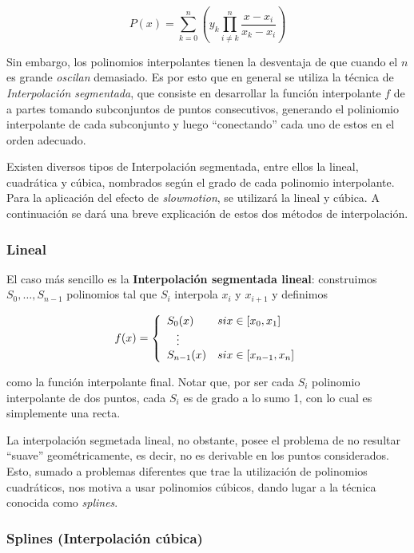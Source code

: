 \[P(x) = \sum_{k = 0}^n \left(y_k \prod_{i \neq k}^n \frac{x - x_i}{x_k - x_i}\right)\]

Sin embargo, los polinomios interpolantes tienen la desventaja de que cuando el $n$ es grande \emph{oscilan} demasiado. Es por esto que en general se utiliza la técnica de \emph{Interpolación segmentada}, que consiste en desarrollar la función interpolante $f$ de a partes tomando subconjuntos de puntos consecutivos, generando el poliniomio interpolante de cada subconjunto y luego ``conectando'' cada uno de estos en el orden adecuado.

Existen diversos tipos de Interpolaci\'on segmentada, entre ellos la lineal, cuadr\'atica y c\'ubica, nombrados según el grado de cada polinomio interpolante. Para la aplicaci\'on del efecto de \emph{slowmotion}, se utilizar\'a la lineal y c\'ubica. A continuaci\'on se dar\'a una breve explicaci\'on de estos dos m\'etodos de interpolaci\'on. 

\subsubsection{Lineal}

El caso m\'as sencillo es la \textbf{Interpolación segmentada lineal}: construimos $S_0, \ldots, S_{n - 1}$ polinomios tal que $S_i$ interpola $x_i$ y $x_{i + 1}$ y definimos

\[
f(x) = 
\left\{
    \begin{array}{ll}
        S_0(x)  & \mbox{si } x \in [x_{0}, x_1] \\
        \hspace{0.3cm}\vdots \\     
        S_{n - 1}(x) & \mbox{si } x \in [x_{n - 1}, x_n]
    \end{array}
\right.
\]

como la función interpolante final. Notar que, por ser cada $S_i$ polinomio interpolante de dos puntos, cada $S_i$ es de grado a lo sumo 1, con lo cual es simplemente una recta.

La interpolación segmetada lineal, no obstante, posee el problema de no resultar ``suave'' geométricamente, es decir, no es derivable en los puntos considerados. Esto, sumado a problemas diferentes que trae la utilización de polinomios cuadráticos, nos motiva a usar polinomios cúbicos, dando lugar a la técnica conocida como \emph{splines}.

\subsubsection{Splines (Interpolaci\'on c\'ubica)}

